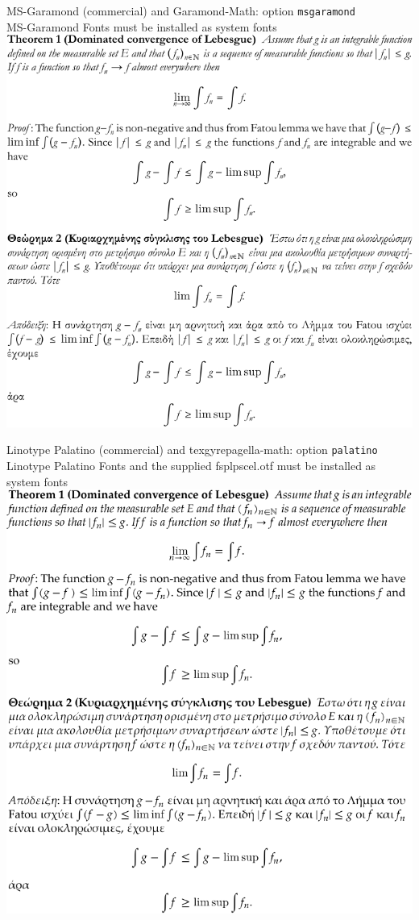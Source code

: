 \documentclass{book}
\begin{document}
\begin{center}
{\Large MS-Garamond (commercial) and Garamond-Math: option \verb|msgaramond|}\\
MS-Garamond Fonts must be installed as system fonts\\[1cm] 
\includegraphics[scale=1.2]{fspsample-msgaramond.pdf}
\end{center}

\newpage

\begin{center}
{\Large Linotype Palatino (commercial) and texgyrepagella-math: option \verb|palatino|}\\
Linotype Palatino Fonts and the supplied fsplpscel.otf must be installed as system fonts\\[1cm] 
\includegraphics[scale=1.2]{fspsample-palatino.pdf}
\end{center}

\newpage
\end{document}
